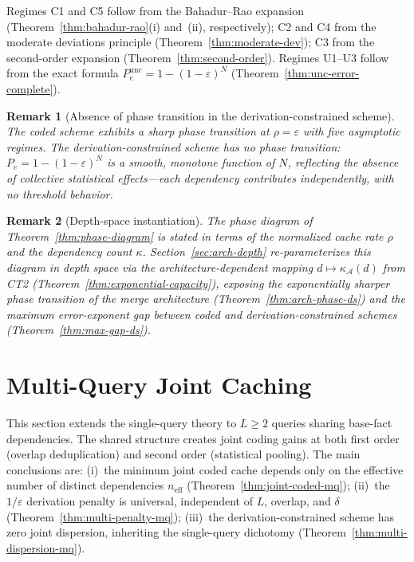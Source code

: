 \documentclass[journal]{IEEEtran}
\makeatletter
\newtheorem{remark}{Remark}[section]
\numberwithin{equation}{section}
\renewenvironment{proof}[1][\proofname]{\par
  \pushQED{\qed}%
  \normalfont \topsep6\p@\@plus6\p@\relax
  \trivlist
  \item[\hskip\labelsep
        \itshape
    #1\@addpunct{.}]\ignorespaces
}{%
  \popQED\endtrivlist\@endpefalse
}
\makeatother
\begin{document}
\begin{proof}
Regimes C1 and C5 follow from the Bahadur--Rao expansion
(Theorem~\ref{thm:bahadur-rao}(i) and~(ii), respectively);
C2 and C4 from the moderate deviations principle
(Theorem~\ref{thm:moderate-dev});
C3 from the second-order expansion
(Theorem~\ref{thm:second-order}).
Regimes U1--U3 follow from the exact formula
$P_e^{\mathrm{unc}}=1{-}(1{-}\varepsilon)^N$
(Theorem~\ref{thm:unc-error-complete}).
\end{proof}

\begin{remark}[Absence of phase transition in the
  derivation-constrained scheme]
\label{rem:no-transition}
The coded scheme exhibits a sharp phase transition at
$\rho=\varepsilon$ with five asymptotic regimes.
The derivation-constrained scheme has no phase transition:
$P_e=1{-}(1{-}\varepsilon)^N$ is a smooth, monotone function
of $N$, reflecting the absence of collective statistical
effects---each dependency contributes independently, with no
threshold behavior.
\end{remark}

\begin{remark}[Depth-space instantiation]
\label{rem:forward-depth}
The phase diagram of Theorem~\ref{thm:phase-diagram} is stated
in terms of the normalized cache rate $\rho$ and the dependency
count $\kappa$.
Section~\ref{sec:arch-depth} re-parameterizes this diagram in
depth space via the architecture-dependent mapping
$d\mapsto\kappa_{\mathcal A}(d)$ from CT2
\textup{(Theorem~\ref{thm:exponential-capacity})}, exposing the
exponentially sharper phase transition of the merge architecture
\textup{(Theorem~\ref{thm:arch-phase-ds})} and the maximum
error-exponent gap between coded and derivation-constrained
schemes \textup{(Theorem~\ref{thm:max-gap-ds})}.
\end{remark}


\section{Multi-Query Joint Caching}
\label{sec:multi-query}

This section extends the single-query theory to $L\ge 2$ queries
sharing base-fact dependencies.
The shared structure creates joint coding gains at both first
order (overlap deduplication) and second order (statistical
pooling).
The main conclusions are: (i)~the minimum joint coded cache
depends only on the effective number of distinct dependencies
$n_{\mathrm{eff}}$ (Theorem~\ref{thm:joint-coded-mq});
(ii)~the $1/\varepsilon$ derivation penalty is universal,
independent of $L$, overlap, and $\delta$
(Theorem~\ref{thm:multi-penalty-mq});
(iii)~the derivation-constrained scheme has zero joint
dispersion, inheriting the single-query dichotomy
(Theorem~\ref{thm:multi-dispersion-mq}).
\end{document}

